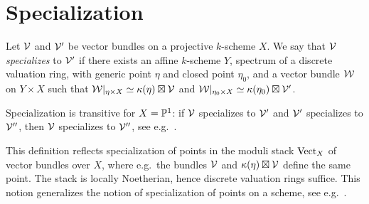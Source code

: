\section{Specialization}

\begin{definition}
	Let $\mathcal{V}$ and $\mathcal{V'}$ be vector bundles on a projective $k$-scheme $X$. We say that $\mathcal{V}$ \emph{specializes} to $\mathcal{V'}$ if there exists an affine $k$-scheme $Y$, spectrum of a discrete valuation ring, with generic point $\eta$ and closed point $\eta_0$, and a vector bundle $\mathcal{W}$ on
	$Y\times X$
	such that
	$\mathcal{W}|_{\eta \times X} \simeq \kappa(\eta)\boxtimes\mathcal{V}$
	and
	$\mathcal{W}|_{\eta_0 \times X} \simeq \kappa(\eta_0)\boxtimes\mathcal{V'}$. 
\end{definition}

\begin{remark}
	Specialization is transitive for $X=\mathbb{P}^1$: if $\mathcal{V}$ specializes to $\mathcal{V'}$ and $\mathcal{V'}$ specializes to $\mathcal{V''}$, then $\mathcal{V}$ specializes to $\mathcal{V''}$, see e.g.\ \cite[Cor.\ 6.14]{ramamathan-deformations}.
\end{remark}

\begin{remark}
	This definition reflects specialization of points in the moduli stack $\mathrm{Vect}_X$ of vector bundles over $X$, where e.g.\ the bundles $\mathcal{V}$ and $\kappa(\eta) \boxtimes \mathcal{V}$ define the same point. The stack is locally Noetherian, hence discrete valuation rings suffice. This notion generalizes the notion of specialization of points on a scheme, see e.g.\ \cite[Prop.\ 7.1.9]{egaii}.
\end{remark}

